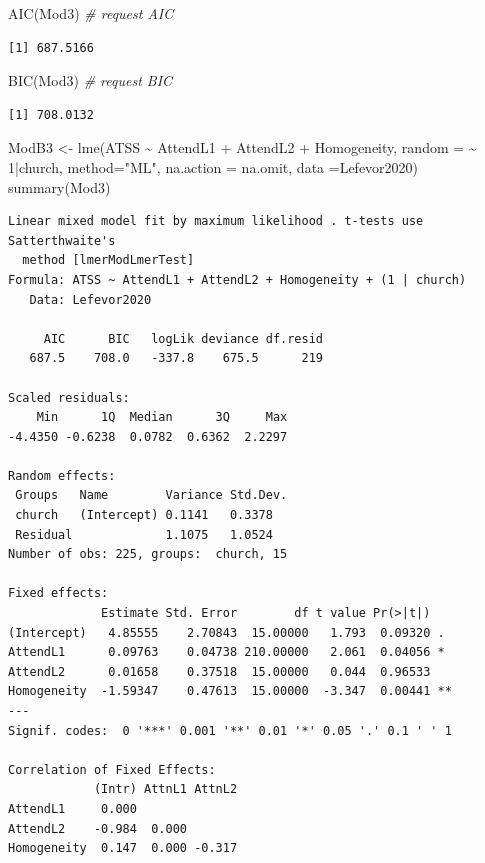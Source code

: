 \documentclass[
  english,
]{book}
\newenvironment{Shaded}{\begin{snugshade}}{\end{snugshade}}
\newcommand{\AttributeTok}[1]{\textcolor[rgb]{0.77,0.63,0.00}{#1}}
\newcommand{\CommentTok}[1]{\textcolor[rgb]{0.56,0.35,0.01}{\textit{#1}}}
\newcommand{\DecValTok}[1]{\textcolor[rgb]{0.00,0.00,0.81}{#1}}
\newcommand{\FunctionTok}[1]{\textcolor[rgb]{0.00,0.00,0.00}{#1}}
\newcommand{\NormalTok}[1]{#1}
\newcommand{\OtherTok}[1]{\textcolor[rgb]{0.56,0.35,0.01}{#1}}
\newcommand{\SpecialCharTok}[1]{\textcolor[rgb]{0.00,0.00,0.00}{#1}}
\newcommand{\StringTok}[1]{\textcolor[rgb]{0.31,0.60,0.02}{#1}}
\begin{document}
\begin{Shaded}
\begin{Highlighting}[]
\FunctionTok{AIC}\NormalTok{(Mod3) }\CommentTok{\# request AIC}
\end{Highlighting}
\end{Shaded}

\begin{verbatim}
[1] 687.5166
\end{verbatim}

\begin{Shaded}
\begin{Highlighting}[]
\FunctionTok{BIC}\NormalTok{(Mod3) }\CommentTok{\# request BIC}
\end{Highlighting}
\end{Shaded}

\begin{verbatim}
[1] 708.0132
\end{verbatim}

\begin{Shaded}
\begin{Highlighting}[]
\NormalTok{ModB3 }\OtherTok{\textless{}{-}} \FunctionTok{lme}\NormalTok{(ATSS }\SpecialCharTok{\textasciitilde{}}\NormalTok{  AttendL1 }\SpecialCharTok{+}\NormalTok{  AttendL2 }\SpecialCharTok{+}\NormalTok{ Homogeneity, }\AttributeTok{random =} \SpecialCharTok{\textasciitilde{}} \DecValTok{1}\SpecialCharTok{|}\NormalTok{church, }\AttributeTok{method=}\StringTok{"ML"}\NormalTok{, }\AttributeTok{na.action =}\NormalTok{ na.omit, }\AttributeTok{data =}\NormalTok{Lefevor2020)}
\FunctionTok{summary}\NormalTok{(Mod3)}
\end{Highlighting}
\end{Shaded}

\begin{verbatim}
Linear mixed model fit by maximum likelihood . t-tests use Satterthwaite's
  method [lmerModLmerTest]
Formula: ATSS ~ AttendL1 + AttendL2 + Homogeneity + (1 | church)
   Data: Lefevor2020

     AIC      BIC   logLik deviance df.resid 
   687.5    708.0   -337.8    675.5      219 

Scaled residuals: 
    Min      1Q  Median      3Q     Max 
-4.4350 -0.6238  0.0782  0.6362  2.2297 

Random effects:
 Groups   Name        Variance Std.Dev.
 church   (Intercept) 0.1141   0.3378  
 Residual             1.1075   1.0524  
Number of obs: 225, groups:  church, 15

Fixed effects:
             Estimate Std. Error        df t value Pr(>|t|)   
(Intercept)   4.85555    2.70843  15.00000   1.793  0.09320 . 
AttendL1      0.09763    0.04738 210.00000   2.061  0.04056 * 
AttendL2      0.01658    0.37518  15.00000   0.044  0.96533   
Homogeneity  -1.59347    0.47613  15.00000  -3.347  0.00441 **
---
Signif. codes:  0 '***' 0.001 '**' 0.01 '*' 0.05 '.' 0.1 ' ' 1

Correlation of Fixed Effects:
            (Intr) AttnL1 AttnL2
AttendL1     0.000              
AttendL2    -0.984  0.000       
Homogeneity  0.147  0.000 -0.317
\end{verbatim}
\end{document}
